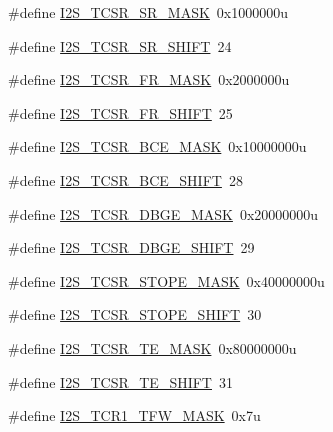 \begin{DoxyCompactItemize}
\item 
\#define \hyperlink{group___i2_s___register___masks_ga0f5f12f7b64d57e778e3025ce7cb1294}{I2\+S\+\_\+\+T\+C\+S\+R\+\_\+\+S\+R\+\_\+\+M\+A\+SK}~0x1000000u
\item 
\#define \hyperlink{group___i2_s___register___masks_gab1a40505d50cdd19b7e37eaa0d6cc184}{I2\+S\+\_\+\+T\+C\+S\+R\+\_\+\+S\+R\+\_\+\+S\+H\+I\+FT}~24
\item 
\#define \hyperlink{group___i2_s___register___masks_gab914972c0af99c736c0873d7c9f325f6}{I2\+S\+\_\+\+T\+C\+S\+R\+\_\+\+F\+R\+\_\+\+M\+A\+SK}~0x2000000u
\item 
\#define \hyperlink{group___i2_s___register___masks_gaee3fc16502863ff4fa31702ca5add676}{I2\+S\+\_\+\+T\+C\+S\+R\+\_\+\+F\+R\+\_\+\+S\+H\+I\+FT}~25
\item 
\#define \hyperlink{group___i2_s___register___masks_ga1a283a2875596890e8d014ba29a2d764}{I2\+S\+\_\+\+T\+C\+S\+R\+\_\+\+B\+C\+E\+\_\+\+M\+A\+SK}~0x10000000u
\item 
\#define \hyperlink{group___i2_s___register___masks_gabcf492ab7f9cc04accd4b8d144a195d8}{I2\+S\+\_\+\+T\+C\+S\+R\+\_\+\+B\+C\+E\+\_\+\+S\+H\+I\+FT}~28
\item 
\#define \hyperlink{group___i2_s___register___masks_ga168b4f72e1d68208f211020224bc4f1d}{I2\+S\+\_\+\+T\+C\+S\+R\+\_\+\+D\+B\+G\+E\+\_\+\+M\+A\+SK}~0x20000000u
\item 
\#define \hyperlink{group___i2_s___register___masks_ga45053916a88f0ce8d3a0798b7529f976}{I2\+S\+\_\+\+T\+C\+S\+R\+\_\+\+D\+B\+G\+E\+\_\+\+S\+H\+I\+FT}~29
\item 
\#define \hyperlink{group___i2_s___register___masks_ga2692628bf911b8951e8f77dbd6809f87}{I2\+S\+\_\+\+T\+C\+S\+R\+\_\+\+S\+T\+O\+P\+E\+\_\+\+M\+A\+SK}~0x40000000u
\item 
\#define \hyperlink{group___i2_s___register___masks_ga931d31ce7c806e53554e29d7cf0db6ed}{I2\+S\+\_\+\+T\+C\+S\+R\+\_\+\+S\+T\+O\+P\+E\+\_\+\+S\+H\+I\+FT}~30
\item 
\#define \hyperlink{group___i2_s___register___masks_ga38911a5988cffd69ad0817c00522518c}{I2\+S\+\_\+\+T\+C\+S\+R\+\_\+\+T\+E\+\_\+\+M\+A\+SK}~0x80000000u
\item 
\#define \hyperlink{group___i2_s___register___masks_gab02a94b13756ac9869d4125313c7d651}{I2\+S\+\_\+\+T\+C\+S\+R\+\_\+\+T\+E\+\_\+\+S\+H\+I\+FT}~31
\item 
\#define \hyperlink{group___i2_s___register___masks_ga26d9f7626514208432dc7850225cc752}{I2\+S\+\_\+\+T\+C\+R1\+\_\+\+T\+F\+W\+\_\+\+M\+A\+SK}~0x7u
\item 

\end{DoxyCompactItemize}
